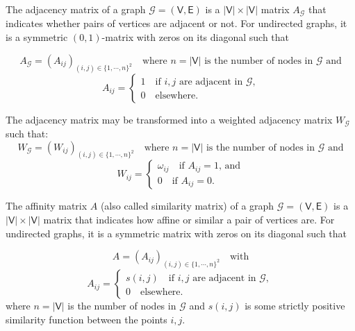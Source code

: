 \begin{definition}
	The adjacency matrix of a graph $\mathcal{G}=(\mathsf{V}, \mathsf{E})$ is a $|\mathsf{V}| \times |\mathsf{V}|$ matrix $A_{\mathcal{G}}$ that indicates whether pairs of vertices are adjacent or not. For undirected graphs, it is a symmetric $(0,1)$-matrix with zeros on its diagonal such that 
	
	\begin{equation}	
		A_{\mathcal{G}} = (A_{ij})_{(i, j)\in \{1,\cdots, n\}^2}  \quad \text{where $n=|\mathsf{V}|$ is the number of nodes in $\mathcal{G}$ and} \nonumber 		
	\end{equation}
	\begin{equation}	
		A_{ij}= 
		\begin{cases}
			1 \quad \text{if $i, j$ are adjacent in $\mathcal{G}$,} \\
			0 \quad \text{elsewhere.}
		\end{cases}		\nonumber		
	\end{equation}

The adjacency matrix may be transformed into a weighted adjacency matrix $W_{\mathcal{G}}$ such that:
	\begin{equation}	
		W_{\mathcal{G}} = (W_{ij})_{(i, j)\in \{1,\cdots, n\}^2}  \quad \text{where $n=|\mathsf{V}|$ is the number of nodes in $\mathcal{G}$ and} \nonumber 		
	\end{equation}
	\begin{equation}	
		W_{ij}= 
		\begin{cases}
			\omega_{ij} \quad \text{if $A_{ij}=1$, and} \\
			0 \quad \text{if $A_{ij}=0$.}
		\end{cases}		\nonumber		
	\end{equation}

\end{definition}

\begin{definition}
	The affinity matrix $A$ (also called similarity matrix) of a graph $\mathcal{G}=(\mathsf{V}, \mathsf{E})$ is a $|\mathsf{V}| \times |\mathsf{V}|$ matrix that indicates how affine or similar a pair of vertices are. For undirected graphs, it is a symmetric matrix with zeros on its diagonal such that 
	
	\begin{equation}	
		A = (A_{ij})_{(i, j)\in \{1,\cdots, n\}^2}  \quad \text{with}  \nonumber 		
	\end{equation}
	\begin{equation}	
		A_{ij}= 
		\begin{cases}
			s(i,j) \quad \text{if $i, j$ are adjacent in $\mathcal{G}$}, \\
			0 \quad \text{elsewhere}.
		\end{cases}	 \nonumber		
	\end{equation}
where $n=|\mathsf{V}|$ is the number of nodes in $\mathcal{G}$ and $s(i,j)$ is some strictly positive similarity function between the points $i,j$.
\end{definition}


